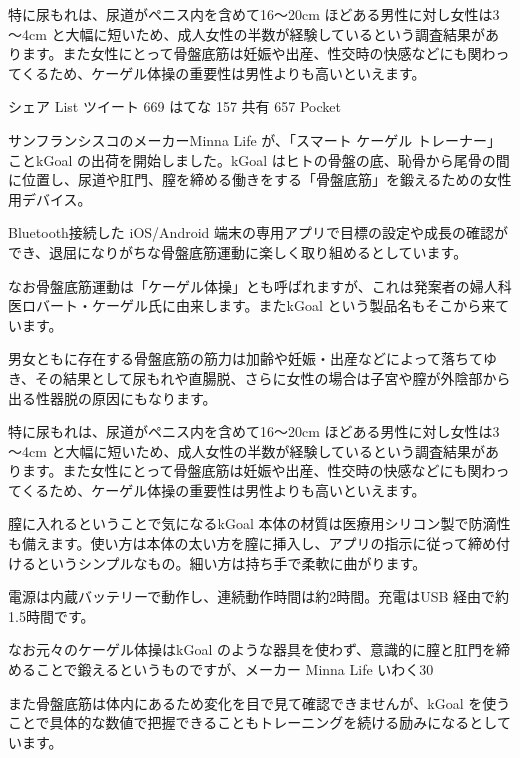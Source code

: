 特に尿もれは、尿道がペニス内を含めて16～20cm ほどある男性に対し女性は3～4cm と大幅に短いため、成人女性の半数が経験しているという調査結果があります。また女性にとって骨盤底筋は妊娠や出産、性交時の快感などにも関わってくるため、ケーゲル体操の重要性は男性よりも高いといえます。



    シェア
    List
    ツイート
    669
    はてな
    157
    共有
    657
    Pocket



サンフランシスコのメーカーMinna Life が、「スマート ケーゲル トレーナー」ことkGoal の出荷を開始しました。kGoal はヒトの骨盤の底、恥骨から尾骨の間に位置し、尿道や肛門、膣を締める働きをする「骨盤底筋」を鍛えるための女性用デバイス。

Bluetooth接続した iOS/Android 端末の専用アプリで目標の設定や成長の確認ができ、退屈になりがちな骨盤底筋運動に楽しく取り組めるとしています。

なお骨盤底筋運動は「ケーゲル体操」とも呼ばれますが、これは発案者の婦人科医ロバート・ケーゲル氏に由来します。またkGoal という製品名もそこから来ています。


男女ともに存在する骨盤底筋の筋力は加齢や妊娠・出産などによって落ちてゆき、その結果として尿もれや直腸脱、さらに女性の場合は子宮や膣が外陰部から出る性器脱の原因にもなります。

特に尿もれは、尿道がペニス内を含めて16～20cm ほどある男性に対し女性は3～4cm と大幅に短いため、成人女性の半数が経験しているという調査結果があります。また女性にとって骨盤底筋は妊娠や出産、性交時の快感などにも関わってくるため、ケーゲル体操の重要性は男性よりも高いといえます。



膣に入れるということで気になるkGoal 本体の材質は医療用シリコン製で防滴性も備えます。使い方は本体の太い方を膣に挿入し、アプリの指示に従って締め付けるというシンプルなもの。細い方は持ち手で柔軟に曲がります。

電源は内蔵バッテリーで動作し、連続動作時間は約2時間。充電はUSB 経由で約1.5時間です。

なお元々のケーゲル体操はkGoal のような器具を使わず、意識的に膣と肛門を締めることで鍛えるというものですが、メーカー Minna Life いわく30%

また骨盤底筋は体内にあるため変化を目で見て確認できませんが、kGoal を使うことで具体的な数値で把握できることもトレーニングを続ける励みになるとしています。


